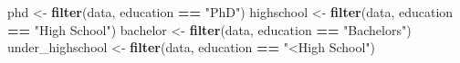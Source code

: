 \documentclass[]{article}
\newenvironment{Shaded}{\begin{snugshade}}{\end{snugshade}}
\newcommand{\KeywordTok}[1]{\textcolor[rgb]{0.13,0.29,0.53}{\textbf{#1}}}
\newcommand{\StringTok}[1]{\textcolor[rgb]{0.31,0.60,0.02}{#1}}
\newcommand{\OperatorTok}[1]{\textcolor[rgb]{0.81,0.36,0.00}{\textbf{#1}}}
\newcommand{\NormalTok}[1]{#1}
\begin{document}
\begin{Shaded}
\begin{Highlighting}[]
\NormalTok{phd <-}\StringTok{ }\KeywordTok{filter}\NormalTok{(data, education }\OperatorTok{==}\StringTok{ "PhD"}\NormalTok{)}
\NormalTok{highschool <-}\StringTok{ }\KeywordTok{filter}\NormalTok{(data, education }\OperatorTok{==}\StringTok{ "High School"}\NormalTok{)}
\NormalTok{bachelor  <-}\StringTok{ }\KeywordTok{filter}\NormalTok{(data, education }\OperatorTok{==}\StringTok{ "Bachelors"}\NormalTok{)}
\NormalTok{under_highschool <-}\StringTok{ }\KeywordTok{filter}\NormalTok{(data, education }\OperatorTok{==}\StringTok{ "<High School"}\NormalTok{)}
\end{Highlighting}
\end{Shaded}
\end{document}
